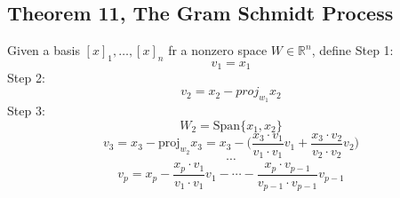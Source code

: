 \subsection{Theorem 11, The Gram Schmidt Process}
Given a basis $[x]_{1},\ldots,[x]_{n}$ fr a nonzero space $W\in\mathbb{R}^{n}$, define
Step 1:
\begin{equation}
	\label{}
	v_{1}=x_{1}
\end{equation}
Step 2:
\begin{equation}
	\label{}
	v_{2}=x_{2}-proj_{w_{1}}x_{2}
\end{equation}
Step 3:
\begin{equation}
	\label{}
	W_{2}=\mbox{Span}\{x_{1},x_{2}\}
\end{equation}
\begin{equation}
	\label{}
	v_{3}=x_{3}-\mbox{proj}_{w_{2}}x_{3}=x_{3}-\biggl(\frac{x_{3}\cdot v_{1}}{v_{1}\cdot v_{1}}v_{1}+ \frac{x_{3}\cdot v_{2}}{v_{2}\cdot v_{2}}v_{2}\biggr)
\end{equation}
\begin{equation}
	\label{}
\cdots	
\end{equation}
\begin{equation}
	\label{}
v_{p}=x_{p}-\frac{x_{p}\cdot v_{1}}{v_{1}\cdot v_{1}}v_{1}-\cdots -\frac{x_{p}\cdot v_{p-1}}{v_{p-1}\cdot v_{p-1}}v_{p-1}
\end{equation}


